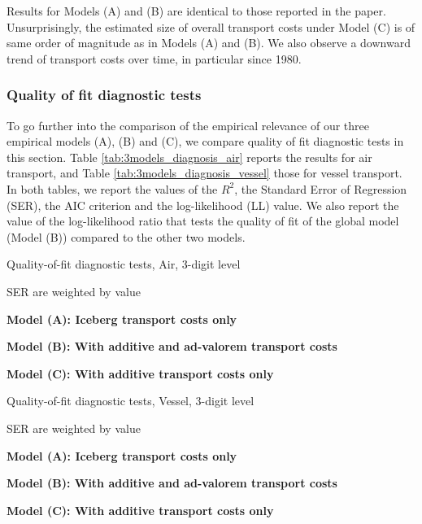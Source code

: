 \documentclass[11pt,twoside, authoryear]{elsarticle}
\begin{document}
Results for Models (A) and (B) are identical to those reported in the paper. Unsurprisingly, the estimated size of overall transport costs under Model (C) is of same order of magnitude as in Models (A) and (B). We also observe a downward trend of transport costs over time, in particular since 1980.\\



\subsubsection{Quality of fit diagnostic tests}

To go further into the comparison of the empirical relevance of our three empirical models (A), (B) and (C), we compare quality of fit diagnostic tests in this section. Table \ref{tab:3models_diagnosis_air} reports the results for air transport, and Table \ref{tab:3models_diagnosis_vessel} those for vessel transport. In both tables, we report the values of the $R^2$, the Standard Error of Regression (SER), the AIC criterion  and the log-likelihood (LL) value. We also report the value of the log-likelihood ratio that tests the quality of fit of the global model (Model (B)) compared to the other two models.

\begin{table}[htbp]
\centering
\footnotesize{
	\caption{Quality-of-fit diagnostic tests, Air, 3-digit level}
	\label{tab:3models_diagnosis_air}%
	
\begin{tablenotes}
	\tiny
	\item SER are weighted by value
	\item \textbf{Model (A): Iceberg transport costs only}
	\item \textbf{Model (B): With additive and ad-valorem transport costs}
	\item \textbf{Model (C): With additive transport costs only}
\end{tablenotes}
}
\end{table}%



\begin{table}[htbp]
	\centering
	\footnotesize{
		\caption{Quality-of-fit diagnostic tests, Vessel, 3-digit level}
		\label{tab:3models_diagnosis_vessel}%
		
		\begin{tablenotes}
			\tiny
			\item SER are weighted by value
			\item \textbf{Model (A): Iceberg transport costs only}
			\item \textbf{Model (B): With additive and ad-valorem transport costs}
			\item \textbf{Model (C): With additive transport costs only}
\end{tablenotes}
}
\end{table}%
\end{document}
